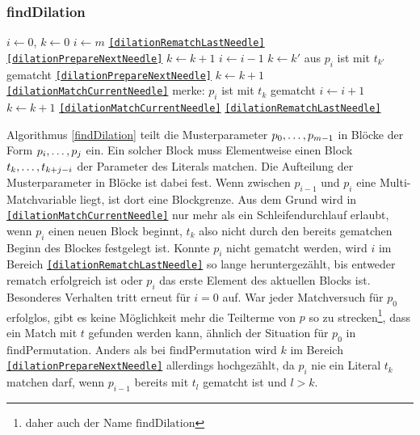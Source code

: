\subsubsection {findDilation}
\begin{algorithm}
\DontPrintSemicolon
\caption{$\mathrm{findDilation} \colon M \times T \times \mathit{Bool} \rightarrow \mathit{Bool}$}\label{findDilation}
\Let $i \leftarrow 0$, $k \leftarrow 0$\;
 {
	$i \leftarrow m$\;
	\Goto \texttt{\ref{dilationRematchLastNeedle}}\;
}
 {
}
 {
}
 \label{dilationMatchCurrentNeedle} 
 {
	 { 
		 {
			\Goto \texttt{\ref{dilationPrepareNextNeedle}}\;
		}
		$k \leftarrow k + 1$\;
	}
}
 \label{dilationRematchLastNeedle} 
 {
	$i \leftarrow i - 1$\;
	{$k \leftarrow k'$ aus \glqq $p_{i}$ ist mit $t_{k'}$ gematcht\grqq{}}\;
	 {
		\Goto \texttt{\ref{dilationPrepareNextNeedle}}\;
	}
	 {
		$k \leftarrow k + 1$\;
	\Goto \texttt{\ref{dilationMatchCurrentNeedle}}\;
	}
}
\;
 \label{dilationPrepareNextNeedle} 
merke: $p_i$ ist mit $t_k$ gematcht\;
$i \leftarrow i + 1$\;
$k \leftarrow k + 1$\;
 {
	\Goto \texttt{\ref{dilationMatchCurrentNeedle}}\;
}
 {
	\Goto \texttt{\ref{dilationRematchLastNeedle}}\;
}
\end{algorithm}


Algorithmus \ref{findDilation} teilt die Musterparameter ${p}_{0}, \dots, {p}_{m-1}$ in Blöcke der Form ${p}_{i}, \dots, {p}_{j}$ ein. Ein solcher Block muss Elementweise einen Block ${t}_{k}, \dots, {t}_{k + j - i}$ der Parameter des Literals matchen. Die Aufteilung der Musterparameter in Blöcke ist dabei fest. Wenn zwischen $p_{i-1}$ und $p_{i}$ eine Multi-Matchvariable liegt, ist dort eine Blockgrenze. Aus dem Grund wird in \texttt{\ref{dilationMatchCurrentNeedle}} nur mehr als ein Schleifendurchlauf erlaubt, wenn $p_i$ einen neuen Block beginnt, $t_k$ also nicht durch den bereits gematchen Beginn des Blockes festgelegt ist. 
Konnte $p_i$ nicht gematcht werden, wird  $i$ im Bereich \texttt{\ref{dilationRematchLastNeedle}} so lange heruntergezählt, bis entweder $\mathrm{rematch}$ erfolgreich ist oder $p_i$ das erste Element des aktuellen Blocks ist. Besonderes Verhalten tritt erneut für $i = 0$ auf. War jeder Matchversuch für $p_0$ erfolglos, gibt es keine Möglichkeit mehr die Teilterme von $p$ so zu \glqq strecken\grqq{}\footnote{daher auch der Name $\mathrm{findDilation}$}, dass ein Match mit $t$ gefunden werden kann, ähnlich der Situation für $p_0$ in $\mathrm{findPermutation}$. Anders als bei $\mathrm{findPermutation}$ wird $k$ im Bereich \texttt{\ref{dilationPrepareNextNeedle}} allerdings hochgezählt, da $p_i$ nie ein Literal $t_k$ matchen darf, wenn $p_{i-1}$ bereits mit $t_l$ gematcht ist und $l > k$.


